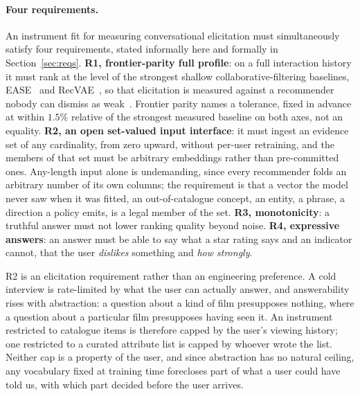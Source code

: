 \documentclass[manuscript,screen]{acmart}
\begin{document}
\paragraph{Four requirements.} An instrument fit for measuring conversational elicitation must simultaneously satisfy four requirements, stated informally here and formally in Section~\ref{sec:reqs}. \textbf{R1, frontier-parity full profile}: on a full interaction history it must rank at the level of the strongest shallow collaborative-filtering baselines, EASE~\citep{steck2019ease} and RecVAE~\citep{ren2020recvae}, so that elicitation is measured against a recommender nobody can dismiss as weak~\citep{dacrema2019progress}. Frontier parity names a tolerance, fixed in advance at within $1.5\%$ relative of the strongest measured baseline on both axes, not an equality. \textbf{R2, an open set-valued input interface}: it must ingest an evidence set of any cardinality, from zero upward, without per-user retraining, and the members of that set must be arbitrary embeddings rather than pre-committed ones. Any-length input alone is undemanding, since every recommender folds an arbitrary number of its own columns; the requirement is that a vector the model never saw when it was fitted, an out-of-catalogue concept, an entity, a phrase, a direction a policy emits, is a legal member of the set. \textbf{R3, monotonicity}: a truthful answer must not lower ranking quality beyond noise. \textbf{R4, expressive answers}: an answer must be able to say what a star rating says and an indicator cannot, that the user \emph{dislikes} something and \emph{how strongly}.

R2 is an elicitation requirement rather than an engineering preference. A cold interview is rate-limited by what the user can actually answer, and answerability rises with abstraction: a question about a kind of film presupposes nothing, where a question about a particular film presupposes having seen it. An instrument restricted to catalogue items is therefore capped by the user's viewing history; one restricted to a curated attribute list is capped by whoever wrote the list. Neither cap is a property of the user, and since abstraction has no natural ceiling, any vocabulary fixed at training time forecloses part of what a user could have told us, with which part decided before the user arrives.
\end{document}
